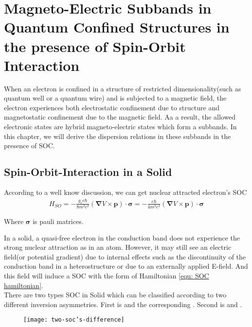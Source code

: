 \section{Magneto-Electric Subbands in Quantum Confined Structures in the presence of Spin-Orbit Interaction}
\label{sec: magneto-electric subbands}

When an electron is confined in a structure of restricted dimensionality(such as quantum well or a quantum wire) and is subjected to a  magnetic field, the electron experiences both electrostatic confinement due to structure and magnetostatic confinement due to the magnetic field. Aa a result, the allowed electronic states are hybrid magneto-electric states which form a subbands. In this chapter, we will derive the dispersion relations in these subbands in the presence of SOC.



\subsection{Spin-Orbit-Interaction in a Solid}
\label{sec: spin orbit interaction in a solid}
According to a well know discussion, we can get nuclear attracted electron's SOC
\begin{align}
	H_{SO}=-\frac{g_ee\hbar}{8m^2c^2}(\pmb{\nabla}V\times\pmb{p})\cdot\pmb{\sigma}=-\frac{e\hbar}{4m^2c^2}(\pmb{\nabla}V\times\pmb{p})\cdot\pmb{\sigma}
	\label{equ: SOC hamiltonian}
\end{align}

Where $\pmb{\sigma}$ is pauli matrices. 

In a solid, a quasi-free electron in the conduction band does not experience the strong nuclear attraction as in an atom. However, it may still see an electric field(or potential gradient) due to internal effects such as the discontinuity of the conduction band in a heterostructure or due to an externally applied E-field. And this field will induce a SOC with the form of Hamiltonian \ref{equ: SOC hamiltonian}. \\

There are two types SOC in Solid which can be classified according to two different inversion asymmetries. First is  and the corresponding . Second is  and . \\

\begin{figure}[H]
	\centering
	\texttt{[image: two-soc's-difference]}
\end{figure}

